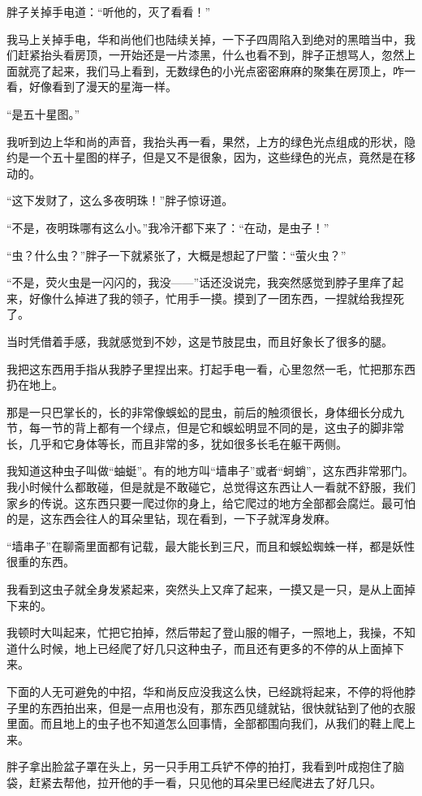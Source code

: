 胖子关掉手电道：“听他的，灭了看看！”

我马上关掉手电，华和尚他们也陆续关掉，一下子四周陷入到绝对的黑暗当中，我们赶紧抬头看房顶，一开始还是一片漆黑，什么也看不到，胖子正想骂人，忽然上面就亮了起来，我们马上看到，无数绿色的小光点密密麻麻的聚集在房顶上，咋一看，好像看到了漫天的星海一样。

“是五十星图。”

我听到边上华和尚的声音，我抬头再一看，果然，上方的绿色光点组成的形状，隐约是一个五十星图的样子，但是又不是很象，因为，这些绿色的光点，竟然是在移动的。

“这下发财了，这么多夜明珠！”胖子惊讶道。

“不是，夜明珠哪有这么小。”我冷汗都下来了：“在动，是虫子！”

“虫？什么虫？”胖子一下就紧张了，大概是想起了尸蟞：“萤火虫？”

“不是，荧火虫是一闪闪的，我没——”话还没说完，我突然感觉到脖子里痒了起来，好像什么掉进了我的领子，忙用手一摸。摸到了一团东西，一捏就给我捏死了。

当时凭借着手感，我就感觉到不妙，这是节肢昆虫，而且好象长了很多的腿。

我把这东西用手指从我脖子里捏出来。打起手电一看，心里忽然一毛，忙把那东西扔在地上。

那是一只巴掌长的，长的非常像蜈蚣的昆虫，前后的触须很长，身体细长分成九节，每一节的背上都有一个绿点，但是它和蜈蚣明显不同的是，这虫子的脚非常长，几乎和它身体等长，而且非常的多，犹如很多长毛在躯干两侧。

我知道这种虫子叫做“蚰蜓”。有的地方叫“墙串子”或者“蚵蛸”，这东西非常邪门。我小时候什么都敢碰，但是就是不敢碰它，总觉得这东西让人一看就不舒服，我们家乡的传说。这东西只要一爬过你的身上，给它爬过的地方全部都会腐烂。最可怕的是，这东西会往人的耳朵里钻，现在看到，一下子就浑身发麻。

“墙串子”在聊斋里面都有记载，最大能长到三尺，而且和蜈蚣蜘蛛一样，都是妖性很重的东西。

我看到这虫子就全身发紧起来，突然头上又痒了起来，一摸又是一只，是从上面掉下来的。

我顿时大叫起来，忙把它拍掉，然后带起了登山服的帽子，一照地上，我操，不知道什么时候，地上已经爬了好几只这种虫子，而且还有更多的不停的从上面掉下来。

下面的人无可避免的中招，华和尚反应没我这么快，已经跳将起来，不停的将他脖子里的东西拍出来，但是一点用也没有，那东西见缝就钻，很快就钻到了他的衣服里面。而且地上的虫子也不知道怎么回事情，全部都围向我们，从我们的鞋上爬上来。

胖子拿出脸盆子罩在头上，另一只手用工兵铲不停的拍打，我看到叶成抱住了脑袋，赶紧去帮他，拉开他的手一看，只见他的耳朵里已经爬进去了好几只。

